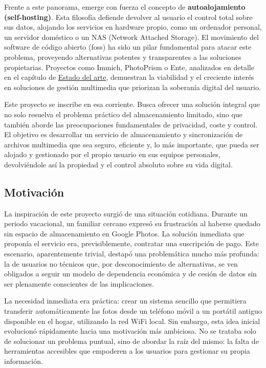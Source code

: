 Frente a este panorama, emerge con fuerza el concepto de \textbf{autoalojamiento (self-hosting)}. Esta filosofía defiende devolver al usuario el control total sobre sus datos, alojando los servicios en hardware propio, como un ordenador personal, un servidor doméstico o un NAS (Network Attached Storage). El movimiento del software de código abierto (\acrshort{foss}) ha sido un pilar fundamental para atacar este problema, proveyendo alternativas potentes y transparentes a las soluciones propietarias. Proyectos como Immich, PhotoPrism o Ente, analizados en detalle en el capítulo de \hyperref[sec:estado_del_arte]{Estado del arte}, demuestran la viabilidad y el creciente interés en soluciones de gestión multimedia que priorizan la soberanía digital del usuario.

Este proyecto se inscribe en esa corriente. Busca ofrecer una solución integral que no solo resuelva el problema práctico del almacenamiento limitado, sino que también aborde las preocupaciones fundamentales de privacidad, coste y control. El objetivo es desarrollar un servicio de almacenamiento y sincronización de archivos multimedia que sea seguro, eficiente y, lo más importante, que pueda ser alojado y gestionado por el propio usuario en sus equipos personales, devolviéndole así la propiedad y el control absoluto sobre su vida digital.

\subsection{Motivación}

La inspiración de este proyecto surgió de una situación cotidiana. Durante un periodo vacacional, un familiar cercano expresó su frustración al haberse quedado sin espacio de almacenamiento en Google Photos. La solución inmediata que proponía el servicio era, previsiblemente, contratar una suscripción de pago. Este escenario, aparentemente trivial, destapó una problemática mucho más profunda: la de usuarios no técnicos que, por desconocimiento de alternativas, se ven obligados a seguir un modelo de dependencia económica y de cesión de datos sin ser plenamente conscientes de las implicaciones.

La necesidad inmediata era práctica: crear un sistema sencillo que permitiera transferir automáticamente las fotos desde un teléfono móvil a un portátil antiguo disponible en el hogar, utilizando la red WiFi local. Sin embargo, esta idea inicial evolucionó rápidamente hacia una motivación más ambiciosa. No se trataba solo de solucionar un problema puntual, sino de abordar la raíz del mismo: la falta de herramientas accesibles que empoderen a los usuarios para gestionar su propia información.

